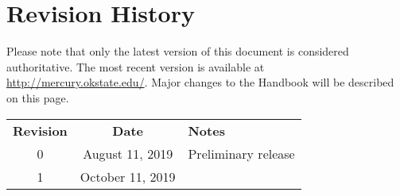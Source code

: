\section*{Revision History}
Please note that only the latest version of this document is considered authoritative. The most recent version is available at \url{http://mercury.okstate.edu/}. Major changes to the Handbook will be described on this page.

\begin{tabular}{ccl}
\textbf{Revision}	&	\textbf{Date}				&	\textbf{Notes} \\
0					&	 	August 11, 2019					&	Preliminary release \\
1					&		October 11, 2019					&		\\
\end{tabular}